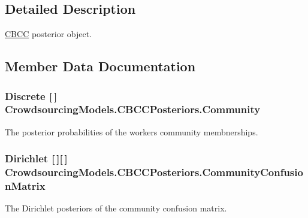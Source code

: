 \subsection{Detailed Description}
\hyperlink{class_crowdsourcing_models_1_1_c_b_c_c}{C\+B\+C\+C} posterior object. 



\subsection{Member Data Documentation}
\hypertarget{class_crowdsourcing_models_1_1_c_b_c_c_posteriors_ae0c96f63928949598cdd0051dc97c419}{}
\subsubsection[{Community}]{\setlength{\rightskip}{0pt plus 5cm}Discrete \mbox{[}$\,$\mbox{]} Crowdsourcing\+Models.\+C\+B\+C\+C\+Posteriors.\+Community}\label{class_crowdsourcing_models_1_1_c_b_c_c_posteriors_ae0c96f63928949598cdd0051dc97c419}


The posterior probabilities of the workers community membnerships. 

\hypertarget{class_crowdsourcing_models_1_1_c_b_c_c_posteriors_a66a61bd5cab64b9ada79b2ed55cf832a}{}
\subsubsection[{Community\+Confusion\+Matrix}]{\setlength{\rightskip}{0pt plus 5cm}Dirichlet \mbox{[}$\,$\mbox{]}\mbox{[}$\,$\mbox{]} Crowdsourcing\+Models.\+C\+B\+C\+C\+Posteriors.\+Community\+Confusion\+Matrix}\label{class_crowdsourcing_models_1_1_c_b_c_c_posteriors_a66a61bd5cab64b9ada79b2ed55cf832a}


The Dirichlet posteriors of the community confusion matrix. 

\hypertarget{class_crowdsourcing_models_1_1_c_b_c_c_posteriors_a5133c813b46dc47a1eca94f718c01560}{}
